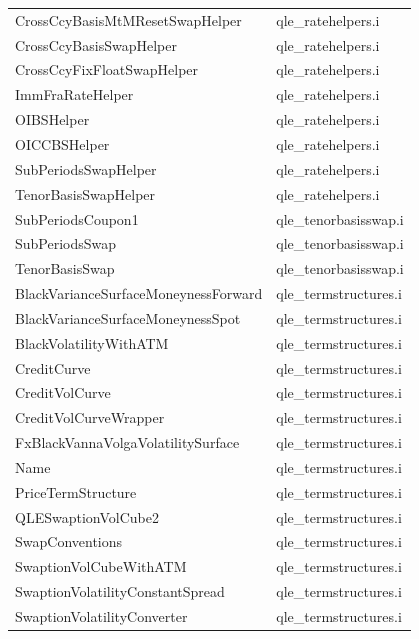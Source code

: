 \documentclass[12pt, a4paper]{report}
\begin{document}
\begin{appendix}
{\begin{longtable}{|l|l|}
CrossCcyBasisMtMResetSwapHelper & qle\_ratehelpers.i \\
CrossCcyBasisSwapHelper & qle\_ratehelpers.i \\
CrossCcyFixFloatSwapHelper & qle\_ratehelpers.i \\
ImmFraRateHelper & qle\_ratehelpers.i \\
OIBSHelper & qle\_ratehelpers.i \\
OICCBSHelper & qle\_ratehelpers.i \\
SubPeriodsSwapHelper & qle\_ratehelpers.i \\
TenorBasisSwapHelper & qle\_ratehelpers.i \\
SubPeriodsCoupon1 & qle\_tenorbasisswap.i \\
SubPeriodsSwap & qle\_tenorbasisswap.i \\
TenorBasisSwap & qle\_tenorbasisswap.i \\
BlackVarianceSurfaceMoneynessForward & qle\_termstructures.i \\
BlackVarianceSurfaceMoneynessSpot & qle\_termstructures.i \\
BlackVolatilityWithATM & qle\_termstructures.i \\
CreditCurve & qle\_termstructures.i \\
CreditVolCurve & qle\_termstructures.i \\
CreditVolCurveWrapper & qle\_termstructures.i \\
FxBlackVannaVolgaVolatilitySurface & qle\_termstructures.i \\
Name & qle\_termstructures.i \\
PriceTermStructure & qle\_termstructures.i \\
QLESwaptionVolCube2 & qle\_termstructures.i \\
SwapConventions & qle\_termstructures.i \\
SwaptionVolCubeWithATM & qle\_termstructures.i \\
SwaptionVolatilityConstantSpread & qle\_termstructures.i \\
SwaptionVolatilityConverter & qle\_termstructures.i \\
\hline
\end{longtable}
}

\end{appendix}
\end{document}
